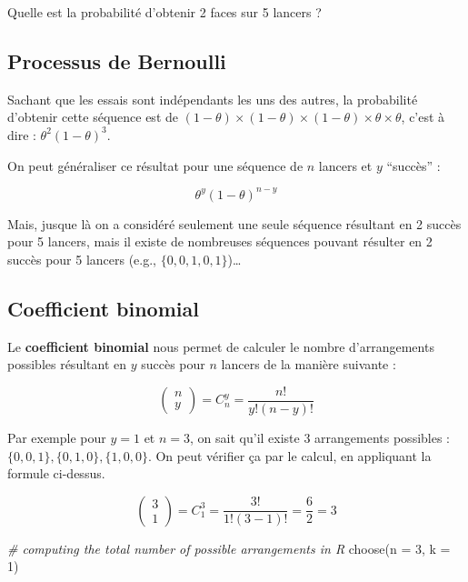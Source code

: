 \documentclass[
  a4paper,11pt,twoside,onecolumn,openright,final,oldfontcommands]{memoir}
\newenvironment{Shaded}{\begin{snugshade}}{\end{snugshade}}
\newcommand{\AttributeTok}[1]{\textcolor[rgb]{0.77,0.63,0.00}{#1}}
\newcommand{\CommentTok}[1]{\textcolor[rgb]{0.56,0.35,0.01}{\textit{#1}}}
\newcommand{\DecValTok}[1]{\textcolor[rgb]{0.00,0.00,0.81}{#1}}
\newcommand{\FunctionTok}[1]{\textcolor[rgb]{0.00,0.00,0.00}{#1}}
\newcommand{\NormalTok}[1]{#1}
\theoremstyle{definition}
\theoremstyle{definition}
\theoremstyle{definition}
\theoremstyle{remark}
\begin{document}
Quelle est la probabilité d'obtenir 2 faces sur 5 lancers ?

\hypertarget{processus-de-bernoulli-1}{%
\subsection{Processus de Bernoulli}\label{processus-de-bernoulli-1}}

Sachant que les essais sont indépendants les uns des autres, la probabilité d'obtenir cette séquence est de \((1 - \theta) \times (1 - \theta) \times (1 - \theta) \times \theta \times \theta\), c'est à dire : \(\theta^{2} (1 - \theta)^{3}\).

On peut généraliser ce résultat pour une séquence de \(n\) lancers et \(y\) ``succès'' :

\[\theta^{y} (1 - \theta)^{n - y}\]

Mais, jusque là on a considéré seulement une seule séquence résultant en 2 succès pour 5 lancers, mais il existe de nombreuses séquences pouvant résulter en 2 succès pour 5 lancers (e.g., \(\{0, 0, 1, 0, 1\}\))\ldots{}

\hypertarget{coefficient-binomial-1}{%
\subsection{Coefficient binomial}\label{coefficient-binomial-1}}

Le \textbf{coefficient binomial} nous permet de calculer le nombre d'arrangements possibles résultant en \(y\) succès pour \(n\) lancers de la manière suivante :

\[
\left(\begin{array}{l} n \\ y \end{array}\right) = C_{n}^{y} = \frac{n !}{y !(n - y) !}
\]

Par exemple pour \(y = 1\) et \(n = 3\), on sait qu'il existe 3 arrangements possibles : \(\{0, 0, 1\}, \{0, 1, 0\}, \{1, 0, 0\}\). On peut vérifier ça par le calcul, en appliquant la formule ci-dessus.

\[
\left(\begin{array}{l} 3 \\ 1\end{array}\right) = C_{1}^{3} = \frac{3 !}{1 !(3 - 1) !} = \frac{6}{2} = 3
\]

\begin{Shaded}
\begin{Highlighting}[]
\CommentTok{\# computing the total number of possible arrangements in R}
\FunctionTok{choose}\NormalTok{(}\AttributeTok{n =} \DecValTok{3}\NormalTok{, }\AttributeTok{k =} \DecValTok{1}\NormalTok{)}
\end{Highlighting}
\end{Shaded}
\end{document}
